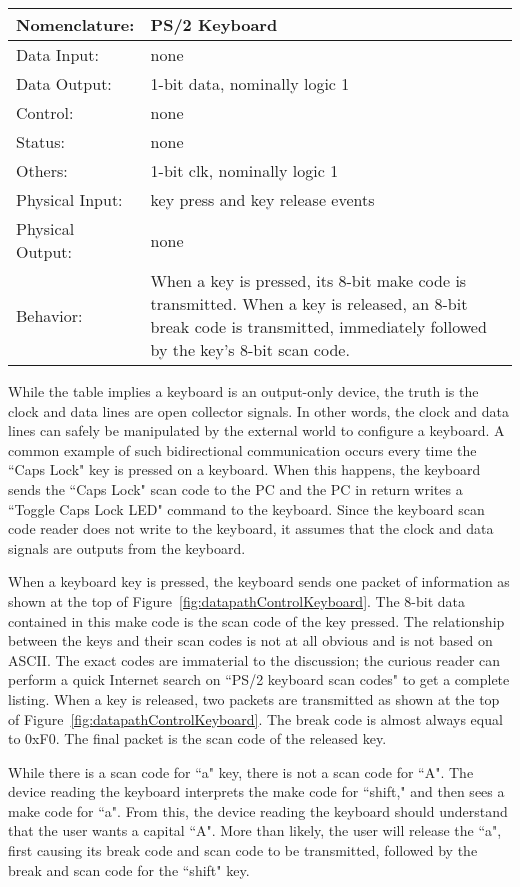 \begin{tabular}{|l|p{3.5in}|} \hline
Nomenclature:  & PS/2 Keyboard				\\ \hline
Data Input:    & none					\\ \hline
Data Output:   & 1-bit data, nominally logic 1		\\ \hline
Control:       & none					\\ \hline
Status:        & none					\\ \hline
Others:        & 1-bit clk, nominally logic 1		\\ \hline
Physical Input:& key press and key release events 	\\ \hline
Physical Output:& none		\\ \hline
Behavior:      & When a key is pressed, its 8-bit make code
		is transmitted.  When a key is released, an
		8-bit break code is transmitted, immediately
		followed by the key's 8-bit scan code.	\\ \hline
\end{tabular}

While the table implies a keyboard is an output-only device, the
truth is the clock and data lines are open collector signals.  In other words, 
the clock and data lines can safely be manipulated by the 
external world to configure a keyboard.  A common example of such 
bidirectional communication occurs every time the
``Caps Lock" key is pressed on a keyboard.  When this happens, the keyboard 
sends the ``Caps Lock" scan code to the PC and the PC in return writes 
a ``Toggle Caps Lock LED" command to the keyboard.  Since the keyboard 
scan code reader does not write to the keyboard, it assumes that the
clock and data signals are outputs from the keyboard.

When a keyboard key is pressed, the keyboard sends one 
packet of information as shown at the top of Figure~\ref{fig:datapathControlKeyboard}.
The 8-bit data contained in this make code is the scan code of the 
key pressed.  The relationship between the keys and their scan codes
is not at all obvious and is not based on ASCII. The exact codes are
immaterial to the discussion; the curious reader can perform a quick 
Internet search on ``PS/2 keyboard scan codes" to get a complete listing.
When a key is released, two packets are transmitted as shown at the 
top of Figure~\ref{fig:datapathControlKeyboard}.  The break code is almost always 
equal to 0xF0.  The final packet is the scan code of the released 
key.  

While there is a scan code for ``a" key, there is not a scan code
for ``A".  The device reading the keyboard interprets the make code
for ``shift," and then sees a make code for ``a".  From this, the device
reading the keyboard should understand that the user wants a capital
``A".  More than likely, the user will release the ``a", first causing 
its break code and scan code to be transmitted, followed by the break
and scan code for the ``shift" key.


